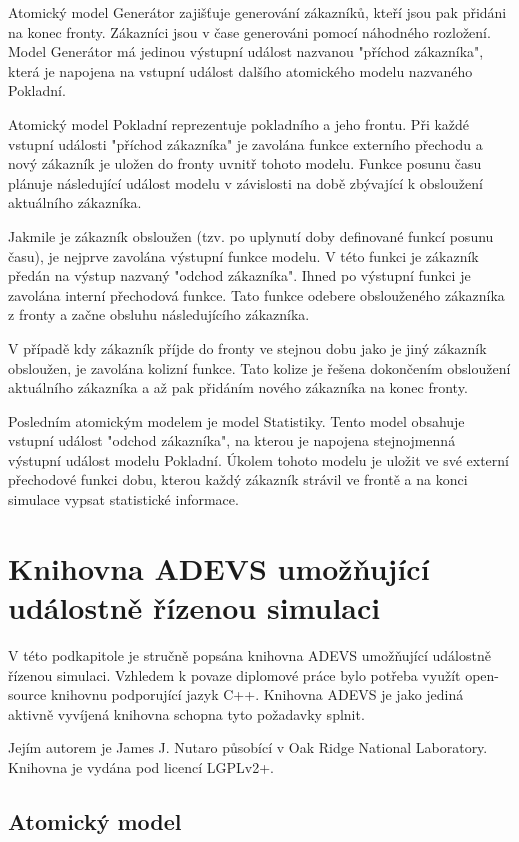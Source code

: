 Atomický model Generátor zajišťuje generování zákazníků, kteří jsou pak přidáni na konec fronty. Zákazníci jsou v čase generováni pomocí náhodného rozložení. Model Generátor má jedinou výstupní událost nazvanou "příchod zákazníka", která je napojena na vstupní událost dalšího atomického modelu nazvaného Pokladní.

Atomický model Pokladní reprezentuje pokladního a jeho frontu. Při každé vstupní události "příchod zákazníka" je zavolána funkce externího přechodu a nový zákazník je uložen do fronty uvnitř tohoto modelu. Funkce posunu času plánuje následující událost modelu v závislosti na době zbývající k obsloužení aktuálního zákazníka.

Jakmile je zákazník obsloužen (tzv. po uplynutí doby definované funkcí posunu času), je nejprve zavolána výstupní funkce modelu. V této funkci je zákazník předán na výstup nazvaný "odchod zákazníka". Ihned po výstupní funkci je zavolána interní přechodová funkce. Tato funkce odebere obslouženého zákazníka z fronty a začne obsluhu následujícího zákazníka.

V případě kdy zákazník příjde do fronty ve stejnou dobu jako je jiný zákazník obsloužen, je zavolána kolizní funkce. Tato kolize je řešena dokončením obsloužení aktuálního zákazníka a až pak přidáním nového zákazníka na konec fronty.

Posledním atomickým modelem je model Statistiky. Tento model obsahuje vstupní událost "odchod zákazníka", na kterou je napojena stejnojmenná výstupní událost modelu Pokladní. Úkolem tohoto modelu je uložit ve své externí přechodové funkci dobu, kterou každý zákazník strávil ve frontě a na konci simulace vypsat statistické informace.

\section{Knihovna ADEVS umožňující událostně řízenou simulaci}

V této podkapitole je stručně popsána knihovna ADEVS umožňující událostně řízenou simulaci. Vzhledem k povaze diplomové práce bylo potřeba využít open-source knihovnu podporující jazyk C++. Knihovna ADEVS je jako jediná aktivně vyvíjená knihovna schopna tyto požadavky splnit.

Jejím autorem je James J. Nutaro působící v Oak Ridge National Laboratory. Knihovna je vydána pod licencí LGPLv2+.

\subsection{Atomický model}

